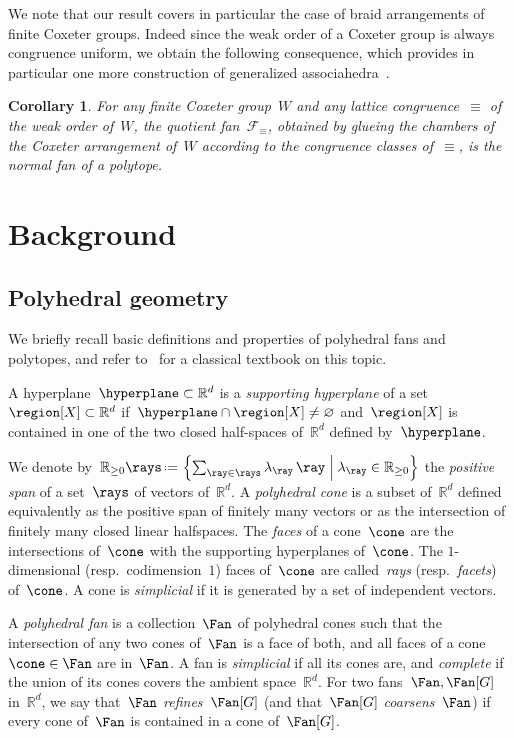 \documentclass{amsart}
\newtheorem{corollary}[theorem]{Corollary}
\theoremstyle{definition}
\newcommand{\R}{\mathbb{R}} %
\newcommand{\set}[2]{\left\{ #1 \;\middle|\; #2 \right\}} %
\newcommand{\eqdef}{\mbox{\,\raisebox{0.2ex}{\scriptsize\ensuremath{\mathrm:}}\ensuremath{=}\,}} %
\newcommand{\darkblue}{\color{darkblue}} %
\newcommand{\defn}[1]{\textsl{\darkblue #1}} %
\newcommand{\fanEquiv}{\mathcal{F}_\equiv} %
\begin{document}
We note that our result covers in particular the case of braid arrangements of finite Coxeter groups.
Indeed since the weak order of a Coxeter group is always congruence uniform, we obtain the following consequence, which provides in particular one more construction of generalized associahedra~\cite{HohlwegLangeThomas, Stella, PilaudStump-brickPolytope, HohlwegPilaudStella}.

\begin{corollary}
For any finite Coxeter group~$W$ and any lattice congruence~$\equiv$ of the weak order of~$W$, the quotient fan~$\fanEquiv$, obtained by glueing the chambers of the Coxeter arrangement of~$W$ according to the congruence classes of~$\equiv$, is the normal fan of a polytope.
\end{corollary}


\section{Background}

\subsection{Polyhedral geometry}

We briefly recall basic definitions and properties of polyhedral fans and polytopes, and refer to~\cite{Ziegler-polytopes} for a classical textbook on this topic.

A hyperplane~$\hyperplane \subset \R^d$ is a \defn{supporting hyperplane} of a set~$\region[X] \subset \R^d$ if~$\hyperplane \cap \region[X] \ne \varnothing$ and~$\region[X]$ is contained in one of the two closed half-spaces of~$\R^d$ defined by~$\hyperplane$.

We denote by~$\R_{\ge0}\rays \eqdef \set{\sum_{\ray \in \rays} \lambda_{\ray} \, \ray}{\lambda_{\ray} \in \R_{\ge0}}$ the \defn{positive span} of a set~$\rays$ of vectors of~$\R^d$.
A \defn{polyhedral cone} is a subset of~$\R^d$ defined equivalently as the positive span of finitely many vectors or as the intersection of finitely many closed linear halfspaces.
The \defn{faces} of a cone~$\cone$ are the intersections of~$\cone$ with the supporting hyperplanes of~$\cone$.
The $1$-dimensional (resp.~codimension~$1$) faces of~$\cone$ are called~\defn{rays} (resp.~\defn{facets}) of~$\cone$.
A cone is \defn{simplicial} if it is generated by a set of independent vectors.

A \defn{polyhedral fan} is a collection~$\Fan$ of polyhedral cones such that the intersection of any two cones of~$\Fan$ is a face of both, and all faces of a cone~$\cone \in \Fan$ are in~$\Fan$.
A fan is \defn{simplicial} if all its cones are, and \defn{complete} if the union of its cones covers the ambient space~$\R^d$.
For two fans~$\Fan, \Fan[G]$ in~$\R^d$, we say that~$\Fan$ \defn{refines}~$\Fan[G]$ (and that~$\Fan[G]$ \defn{coarsens}~$\Fan$) if every cone of~$\Fan$ is contained in a cone of~$\Fan[G]$.
\end{document}
